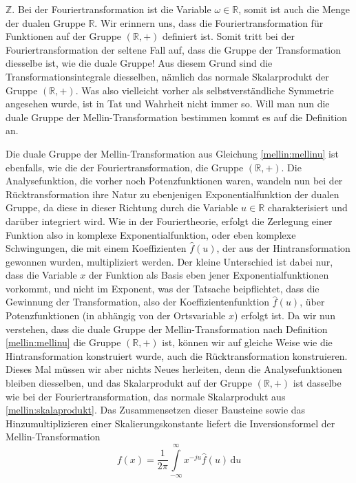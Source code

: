 $\mathbb{Z}$. 
Bei der Fouriertransformation ist die Variable $\omega \in \mathbb{R}$, 
somit ist auch die Menge der dualen Gruppe $\mathbb{R}$.
Wir erinnern uns, dass die Fouriertransformation für Funktionen auf der 
Gruppe $(\mathbb{R},+)$ definiert ist. 
Somit tritt bei der Fouriertransformation der seltene Fall auf, dass die 
Gruppe der Transformation diesselbe ist, wie die duale Gruppe!
Aus diesem Grund sind die Transformationsintegrale diesselben, nämlich das 
normale Skalarprodukt der Gruppe $(\mathbb{R},+)$.
Was also vielleicht vorher als selbstverständliche Symmetrie angesehen 
wurde, ist in Tat und Wahrheit nicht immer so.
Will man nun die duale Gruppe der Mellin-Transformation bestimmen kommt 
es auf die Definition an. 

Die duale Gruppe der Mellin-Transformation aus Gleichung 
\eqref{mellin:mellinu} ist ebenfalls, wie die der Fouriertransformation, 
die Gruppe $(\mathbb{R},+)$.
Die Analysefunktion, die vorher noch Potenzfunktionen waren, wandeln nun 
bei der Rücktransformation ihre Natur zu ebenjenigen Exponentialfunktion
der dualen Gruppe, da diese in dieser Richtung durch die Variable 
$u \in \mathbb{R}$ charakterisiert und darüber integriert wird.
Wie in der Fouriertheorie, erfolgt die Zerlegung einer Funktion also in 
komplexe Exponentialfunktion, oder eben komplexe Schwingungen, die mit 
einem Koeffizienten $\hat{f}(u)$, der aus der Hintransformation gewonnen 
wurden, multipliziert werden.
Der kleine Unterschied ist dabei nur, dass die Variable $x$ der Funktion 
als Basis eben jener Exponentialfunktionen vorkommt, und nicht im Exponent, 
was der Tatsache beipflichtet, dass die Gewinnung der Transformation, 
also der Koeffizientenfunktion $\hat{f}(u)$, über Potenzfunktionen 
(in abhängig von der Ortsvariable $x$) erfolgt ist.
Da wir nun verstehen, dass die duale Gruppe der Mellin-Transformation nach 
Definition \eqref{mellin:mellinu} die Gruppe $(\mathbb{R},+)$ ist, können 
wir auf gleiche Weise wie die Hintransformation konstruiert wurde, auch 
die Rücktransformation konstruieren.
Dieses Mal müssen wir aber nichts Neues herleiten, denn die 
Analysefunktionen bleiben diesselben, und das Skalarprodukt auf der Gruppe 
$(\mathbb{R},+)$ ist dasselbe wie bei der Fouriertransformation, das 
normale Skalarprodukt aus \eqref{mellin:skalaprodukt}. 
Das Zusammensetzen dieser Bausteine sowie das Hinzumultiplizieren einer 
Skalierungskonstante liefert die Inversionsformel der Mellin-Transformation
\begin{equation}
    f(x) = 
    \frac{1}{2\pi} \int\limits_{-\infty}^{\infty} 
    x^{-ju} \hat{f}(u) \,\mathrm{d}u
    \label{mellin:mellininvu}
\end{equation}

